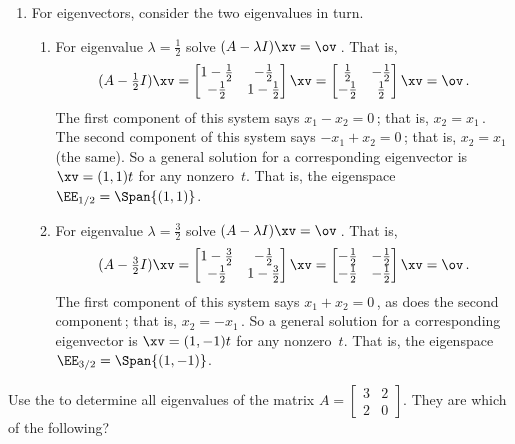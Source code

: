 \begin{example}
\begin{solution}
\begin{enumerate}
\item For eigenvectors, consider the two eigenvalues in turn.
\begin{enumerate}
\item For eigenvalue \(\lambda=\frac12\) solve \((A-\lambda I)\xv=\ov\)\,.  That is,
\begin{equation*}
(A-\tfrac12I)\xv
=\begin{bmatrix} 1-\frac12&-\frac12\\
-\frac12&1-\frac12 \end{bmatrix}\xv
=\begin{bmatrix} \frac12&-\frac12\\
-\frac12&\frac12 \end{bmatrix}\xv
=\ov\,.
\end{equation*}
The first component of this system says \(x_1-x_2=0\)\,; that is, \(x_2=x_1\)\,.  
The second component of this system says \(-x_1+x_2=0\)\,; that is, \(x_2=x_1\) (the same).  
So a general solution for a corresponding eigenvector is \(\xv=(1,1)t\) for any nonzero~\(t\).
That is, the eigenspace \(\EE_{1/2}=\Span \{(1,1)\}\).
\item For eigenvalue \(\lambda=\frac32\) solve \((A-\lambda I)\xv=\ov\)\,.  That is,
\begin{equation*}
(A-\tfrac32I)\xv
=\begin{bmatrix} 1-\frac32&-\frac12\\
-\frac12&1-\frac32 \end{bmatrix}\xv
=\begin{bmatrix} -\frac12&-\frac12\\
-\frac12&-\frac12 \end{bmatrix}\xv
=\ov\,.
\end{equation*}
The first component of this system says \(x_1+x_2=0\)\,, as does the second component\,; that is, \(x_2=-x_1\)\,.  
So a general solution for a corresponding eigenvector is \(\xv=(1,-1)t\) for any nonzero~\(t\).
That is, the eigenspace \(\EE_{3/2}=\Span \{(1,-1)\}\).
\end{enumerate}
\end{enumerate}
\end{solution}
\end{example}




\begin{activity}
Use the  to determine all eigenvalues of the matrix \(A=\begin{bmatrix} 3&2\\2&0 \end{bmatrix}\).
They are which of the following?
\end{activity}




